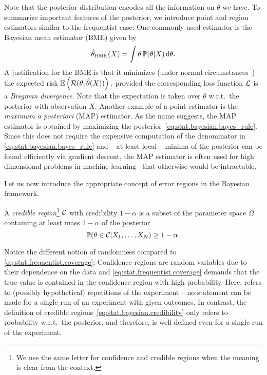 Note that the posterior distribution encodes all the information on $\theta$ we have.
To summarize important features of the posterior, we introduce point and region estimators similar to the frequentist case:
One commonly used estimator is the Bayesian mean estimator (BME) given by
\[
  \hat\theta_\mathrm{BME}(X) = \int \theta \, \mathbb{P}(\theta | X) \, \mathrm{d}\theta.
\]
A justification for the BME is that it minimizes (under normal circumstances~\cite{Lehmann_1998_Theory,Banerjee_2005_On}) the expected risk
\(
  \mathbb{E} \left( \mathcal{R}(\theta, \hat\theta(X)) \right),
\)
provided the corresponding loss function $\mathcal{L}$ is a \emph{Bregman divergence}.
Note that the expectation is taken over $\theta$ w.r.t.\ the posterior with observation $X$.
Another example of a point estimator is the \emph{maximum a posteriori} (MAP) estimator.
As the name suggests, the MAP estimator is obtained by maximizing the posterior~\eqref{eq:stat.bayesian.bayes_rule}.
Since this does not require the expensive computation of the denominator in \cref{eq:stat.bayesian.bayes_rule} and -- at least local -- minima of the posterior can be found efficiently via gradient descent, the MAP estimator is often used for high dimensional problems in machine learning~\cite{Murphy_2012_Machine} that otherwise would be intractable.

Let us now introduce the appropriate concept of error regions in the Bayesian framework.
\begin{definition}%
  \label{def:stat.bayesian.cr}
  A \emph{credible region}\footnote{%
    We use the same letter for confidence and credible regions when the meaning is clear from the context.
  }
  $\mathcal{C}$ with credibility $1-\alpha$ is a subset of the parameter space $\Omega$ containing at least mass $1-\alpha$ of the posterior
  \[
    \label{eq:stat.bayesian.credibility}
    \mathbb{P}(\theta \in \mathcal{C} | X_1, \ldots, X_N) \ge 1-\alpha.
  \]
\end{definition}
Notice the different notion of randomness compared to \cref{eq:stat.frequentist.coverage}:
Confidence regions are random variables due to their dependence on the data and \cref{eq:stat.frequentist.coverage} demands that the true value is contained in the confidence region with high probability.
Here,  refers to (possibly hypothetical) repetitions of the experiment -- no statement can be made for a single run of an experiment with given outcomes.
In contrast, the definition of credible regions~\eqref{eq:stat.bayesian.credibility} only refers to probability w.r.t.\ the posterior, and therefore, is well defined even for a single run of the experiment.

